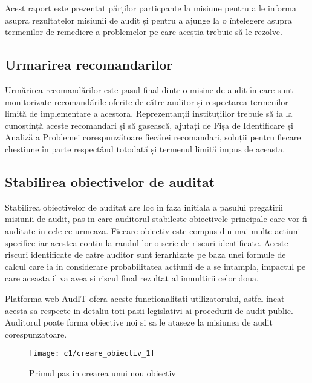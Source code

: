 Acest raport este prezentat părților particpante la misiune pentru a le informa asupra rezultatelor misiunii de audit și pentru a ajunge la o înțelegere asupra termenilor de remediere a problemelor pe care aceștia trebuie să le rezolve.

\subsection*{Urmarirea recomandarilor}

Urmărirea recomandărilor este pasul final dintr-o misine de audit în care sunt monitorizate recomandările oferite de către auditor și respectarea termenilor limită de implementare a acestora. Reprezentanții instituțiilor trebuie să ia la cunoștință aceste recomandari și să gasească, ajutați de Fișa de Identificare și Analiză a Problemei corespunzătoare fiecărei recomandari, soluții pentru fiecare chestiune în parte respectând totodată și termenul limită impus de aceasta.


\subsection{Stabilirea obiectivelor de auditat}

Stabilirea obiectivelor de auditat are loc in faza initiala a pasului pregatirii misiunii de audit, pas in care auditorul stabileste obiectivele principale care vor fi auditate in cele ce urmeaza. Fiecare obiectiv este compus din mai multe actiuni specifice iar acestea contin la randul lor o serie de riscuri identificate. Aceste riscuri identificate de catre auditor sunt ierarhizate pe baza unei formule de calcul care ia in considerare probabilitatea actiunii de a se intampla, impactul pe care aceasta il va avea si riscul final rezultat al inmultirii celor doua.

Platforma web AudIT ofera aceste functionalitati utilizatorului, astfel incat acesta sa respecte in detaliu toti pasii legislativi ai procedurii de audit public. Auditorul poate forma obiective noi si sa le ataseze la misiunea de audit corespunzatoare.\\

\begin{figure}[h]
	\centering
	
	\texttt{[image: c1/creare\_obiectiv\_1]}
	\caption{Primul pas in crearea unui nou obiectiv	}
\end{figure}

